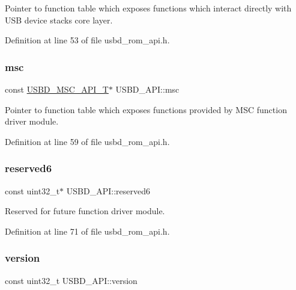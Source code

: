 Pointer to function table which exposes functions which interact directly with U\+SB device stack\textquotesingle{}s core layer. 

Definition at line 53 of file usbd\+\_\+rom\+\_\+api.\+h.

\mbox{\label{struct_u_s_b_d___a_p_i_a0a7fefe527769345f3565fba289c8358}} 
\subsubsection{\texorpdfstring{msc}{msc}}
{\footnotesize\ttfamily const \hyperlink{group___u_s_b_d___m_s_c_ga521bb0e0edf4060aeb10827c6c29f7cf}{U\+S\+B\+D\+\_\+\+M\+S\+C\+\_\+\+A\+P\+I\+\_\+T}$\ast$ U\+S\+B\+D\+\_\+\+A\+P\+I\+::msc}

Pointer to function table which exposes functions provided by M\+SC function driver module. 

Definition at line 59 of file usbd\+\_\+rom\+\_\+api.\+h.

\mbox{\label{struct_u_s_b_d___a_p_i_a4761deeab24d9655d4ab471dee37fe9a}} 
\subsubsection{\texorpdfstring{reserved6}{reserved6}}
{\footnotesize\ttfamily const uint32\+\_\+t$\ast$ U\+S\+B\+D\+\_\+\+A\+P\+I\+::reserved6}

Reserved for future function driver module. 

Definition at line 71 of file usbd\+\_\+rom\+\_\+api.\+h.

\mbox{\label{struct_u_s_b_d___a_p_i_a900209612d9df086dd044b630607955b}} 
\subsubsection{\texorpdfstring{version}{version}}
{\footnotesize\ttfamily const uint32\+\_\+t U\+S\+B\+D\+\_\+\+A\+P\+I\+::version}

